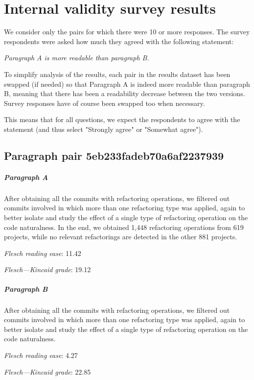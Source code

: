 \chapter{Internal validity survey results\label{app:survey-results}}

We consider only the pairs for which there were 10 or more responses. The survey respondents were asked how much they agreed with the following statement:

\begin{displayquote}
\emph{Paragraph A is more readable than paragraph B.}
\end{displayquote}

To simplify analysis of the results, each pair in the results dataset has been swapped (if needed) so that Paragraph A is indeed more readable than paragraph B, meaning that there has been a readability decrease between the two versions. Survey responses have of course been swapped too when necessary.

This means that for all questions, we expect the respondents to agree with the statement (and thus select "Strongly agree" or "Somewhat agree").


\newpage
\section{Paragraph pair 5eb233fadeb70a6af2237939}
\paragraph{Paragraph A}
After obtaining all the commits with refactoring operations, we filtered out commits involved in which more than one refactoring type was applied, again to better isolate and study the effect of a single type of refactoring operation on the code naturalness. In the end, we obtained 1,448 refactoring operations from 619 projects, while no relevant refactorings are detected in the other 881 projects.\par\medskip
\emph{Flesch reading ease}: 11.42\par
\emph{Flesch---Kincaid grade}: 19.12

\paragraph{Paragraph B}
After obtaining all the commits with refactoring operations, we filtered out commits involved in which more than one refactoring type was applied, again to better isolate and study the effect of a single type of refactoring operation on the code naturalness.\par\medskip
\emph{Flesch reading ease}: 4.27\par
\emph{Flesch---Kincaid grade}: 22.85

